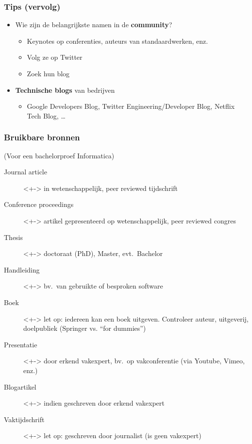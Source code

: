 \documentclass[aspectratio=169]{beamer}
\begin{document}
\begin{frame}
\frametitle{Tips (vervolg)}

\begin{itemize}
    \item<+-> Wie zijn de belangrijkste namen in de \textbf{community}?
    \begin{itemize}
      \item Keynotes op conferenties, auteurs van standaardwerken, enz.
      \item Volg ze op Twitter
      \item Zoek hun blog
    \end{itemize}
    \item<+-> \textbf{Technische blogs} van bedrijven
    \begin{itemize}
      \item Google Developers Blog, Twitter Engineering/Developer Blog, Netflix Tech Blog, \dots
    \end{itemize}
  \end{itemize}
\end{frame}


\begin{frame}
  \frametitle{Bruikbare bronnen}
  
  (Voor een bachelorproef Informatica)
  
  \begin{description}
    \item[Journal article]<+-> in wetenschappelijk, peer reviewed tijdschrift
    \item[Conference proceedings]<+-> artikel gepresenteerd op wetenschappelijk, peer reviewed congres
    \item[Thesis]<+-> doctoraat (PhD), Master, evt.~Bachelor
    \item[Handleiding]<+-> bv.~van gebruikte of besproken software
    \item[Boek]<+-> let op: iedereen kan een boek uitgeven. Controleer auteur, uitgeverij, doelpubliek (Springer vs. ``for dummies'')
    \item[Presentatie]<+-> door erkend vakexpert, bv.~op vakconferentie (via Youtube, Vimeo, enz.)
    \item[Blogartikel]<+-> indien geschreven door erkend vakexpert
    \item[Vaktijdschrift]<+-> let op: geschreven door journalist (is geen vakexpert)
  \end{description}
\end{frame}
\end{document}
